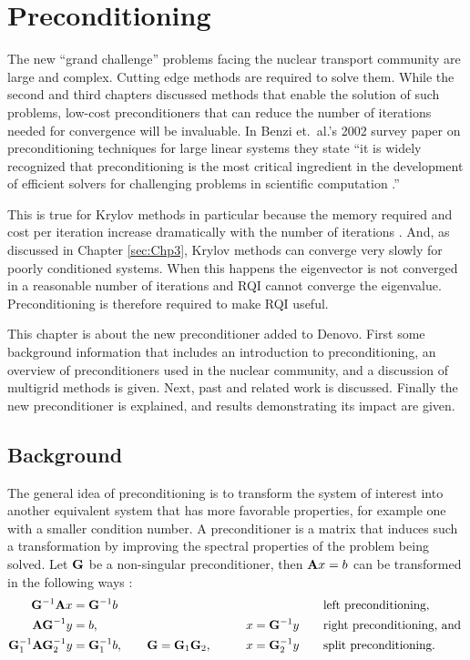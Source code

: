 
\chapter{Preconditioning}
\label{sec:Chp4}
The new ``grand challenge'' problems facing the nuclear transport community are large and complex. Cutting edge methods are required to solve them. While the second and third chapters discussed methods that enable the solution of such problems, low-cost preconditioners that can reduce the number of iterations needed for convergence will be invaluable. In Benzi et.\ al.'s 2002 survey paper on preconditioning techniques for large linear systems they state ``it is widely recognized that preconditioning is the most critical ingredient in the development of efficient solvers for challenging problems in scientific computation \cite{Benzi2002}.'' 

This is true for Krylov methods in particular because the memory required and cost per iteration increase dramatically with the number of iterations \cite{Benzi2002}. And, as discussed in Chapter \ref{sec:Chp3}, Krylov methods can converge very slowly for poorly conditioned systems. When this happens the eigenvector is not converged in a reasonable number of iterations and RQI cannot converge the eigenvalue. Preconditioning is therefore required to make RQI useful. 

This chapter is about the new preconditioner added to Denovo. First some background information that includes an introduction to preconditioning, an overview of preconditioners used in the nuclear community, and a discussion of multigrid methods is given. Next, past and related work is discussed. Finally the new preconditioner is explained, and results demonstrating its impact are given. 

\section{Background}
The general idea of preconditioning is to transform the system of interest into another equivalent system that has more favorable properties, for example one with a smaller condition number. A preconditioner is a matrix that induces such a transformation by improving the spectral properties of the problem being solved. Let $\mathbf{G}$ be a non-singular preconditioner, then $\mathbf{A}x=b$ can be transformed in the following ways \cite{Benzi2002}: 
%
\begin{alignat}{3}
  \mathbf{G}^{-1}\mathbf{A}x &= \mathbf{G}^{-1}b  &  &\text{left preconditioning,} \\
  \mathbf{AG}^{-1}y &= b, \qquad  &x = \mathbf{G}^{-1}y \qquad &\text{right preconditioning, and } \\
  \mathbf{G}_{1}^{-1}\mathbf{AG}_{2}^{-1}y &= \mathbf{G}_{1}^{-1}b, \qquad \mathbf{G} = \mathbf{G}_{1}\mathbf{G}_{2}, \qquad  &x = \mathbf{G}_{2}^{-1}y  \qquad &\text{split preconditioning.} 
\end{alignat}

